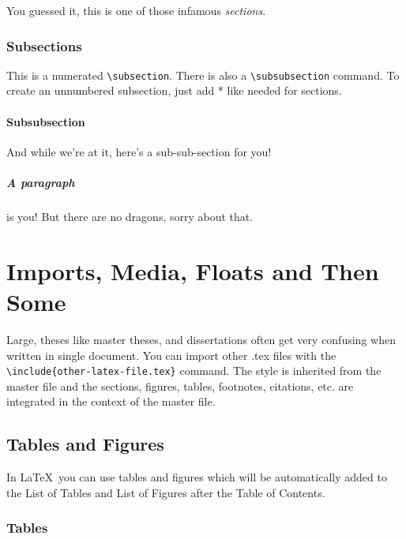 \documentclass[bachelorthesis, deutsch]{syssec-thesis} %
\begin{document}
You guessed it, this is one of those infamous \textit{sections}.

\subsection{Subsections}

This is a numerated \texttt{\textbackslash subsection}. There is also a \texttt{\textbackslash subsubsection} command. To create an unnumbered subsection, just add * like needed for sections.

\subsubsection{Subsubsection}

And while we're at it, here's a sub-sub-section for you!

\paragraph{A paragraph} is you! But there are no dragons, sorry about that.



\chapter{Imports, Media, Floats and Then Some}

Large, theses like master theses, and dissertations often get very confusing when written in single document. You can import other .tex files with the\\\texttt{\textbackslash include\{other-latex-file.tex\}} command. The style is inherited from the master file and the sections, figures, tables, footnotes, citations, etc. are integrated in the context of the master file.

\section{Tables and Figures}
In \LaTeX\ you can use tables and figures which will be automatically added to the List of Tables and List of Figures after the Table of Contents.

\subsection{Tables}
\end{document}
